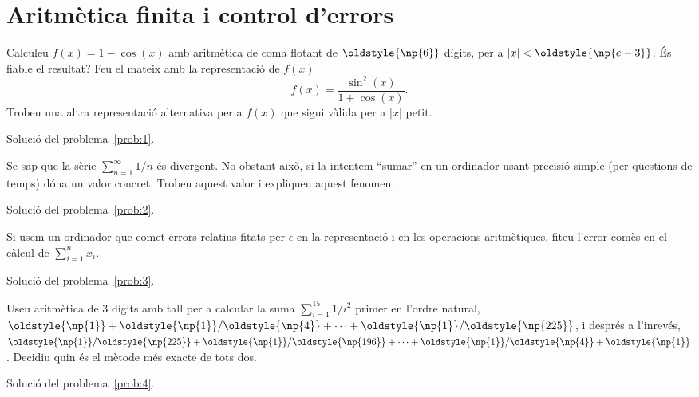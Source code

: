 \documentclass[a4paper,twoside,12pt]{exam}
\newcommand{\osnp}[1]{\oldstyle{\np{#1}}}
\begin{document}
\section{Aritmètica finita i control d'errors}

\begin{questions}
\question\label{prob:1}
Calculeu $f(x) = 1 - \cos(x)$ amb aritmètica de coma flotant de $\osnp{6}$
dígits, per a $|x| < \osnp{e-3}$. És fiable el resultat? Feu el mateix amb la
representació de $f(x)$ 
\begin{displaymath}
	f(x) = \frac{\sin^{2}(x)}{1 + \cos(x)}.
\end{displaymath}
Trobeu una altra representació alternativa per a $f(x)$ que sigui vàlida per a
$|x|$ petit.
\begin{solution}
	Solució del problema~\ref{prob:1}.
\end{solution}

\question\label{prob:2}
Se sap que la sèrie $\sum_{n=1}^{\infty}1/n$ és divergent. No obstant
això, si la intentem ``sumar'' en un ordinador usant precisió simple (per
qüestions de temps) dóna un valor concret. Trobeu aquest valor i expliqueu
aquest fenomen. 
\begin{solution}
	Solució del problema~\ref{prob:2}.
\end{solution}

\question\label{prob:3}
Si usem un ordinador que comet errors relatius fitats per $\epsilon$ en la
representació i en les operacions aritmètiques, fiteu l'error comès en el càlcul
de $\sum_{i=1}^{n} x_{i}$.
\begin{solution}
	Solució del problema~\ref{prob:3}.
\end{solution}

\question\label{prob:4}
Useu aritmètica de $3$ dígits amb tall per a calcular la suma 
$\sum_{i=1}^{15} 1/i^{2}$ primer en l'ordre natural, 
$\osnp{1} + \osnp{1}/\osnp{4} + \dots + \osnp{1}/\osnp{225}$,
i després a l'inrevés, $\osnp{1}/\osnp{225} + \osnp{1}/\osnp{196} +\dots +
\osnp{1}/\osnp{4} + \osnp{1}$. Decidiu quin és el mètode més exacte de tots 
dos. 
\begin{solution}
	Solució del problema~\ref{prob:4}.
\end{solution}


\end{questions}
\end{document}
